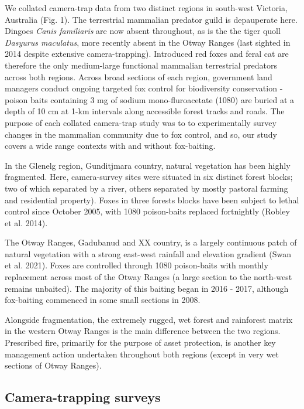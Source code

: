\documentclass[]{elsarticle} %
\begin{document}
We collated camera-trap data from two distinct regions in south-west Victoria, Australia (Fig. 1). The terrestrial mammalian predator guild is depauperate here. Dingoes \emph{Canis familiaris} are now absent throughout, as is the the tiger quoll \emph{Dasyurus maculatus}, more recently absent in the Otway Ranges (last sighted in 2014 despite extensive camera-trapping). Introduced red foxes and feral cat are therefore the only medium-large functional mammalian terrestrial predators across both regions. Across broad sections of each region, government land managers conduct ongoing targeted fox control for biodiversity conservation - poison baits containing 3 mg of sodium mono-fluroacetate (1080) are buried at a depth of 10 cm at 1-km intervals along accessible forest tracks and roads. The purpose of each collated camera-trap study was to to experimentally survey changes in the mammalian community due to fox control, and so, our study covers a wide range contexts with and without fox-baiting.

In the Glenelg region, Gunditjmara country, natural vegetation has been highly fragmented. Here, camera-survey sites were situated in six distinct forest blocks; two of which separated by a river, others separated by mostly pastoral farming and residential property). Foxes in three forests blocks have been subject to lethal control since October 2005, with 1080 poison-baits replaced fortnightly (Robley et al. 2014).

The Otway Ranges, Gadubanud and XX country, is a largely continuous patch of natural vegetation with a strong east-west rainfall and elevation gradient (Swan et al. 2021). Foxes are controlled through 1080 poison-baits with monthly replacement across most of the Otway Ranges (a large section to the north-west remains unbaited). The majority of this baiting began in 2016 - 2017, although fox-baiting commenced in some small sections in 2008.

Alongside fragmentation, the extremely rugged, wet forest and rainforest matrix in the western Otway Ranges is the main difference between the two regions. Prescribed fire, primarily for the purpose of asset protection, is another key management action undertaken throughout both regions (except in very wet sections of Otway Ranges).

\hypertarget{camera-trapping-surveys}{%
\subsection{Camera-trapping surveys}\label{camera-trapping-surveys}}
\end{document}
